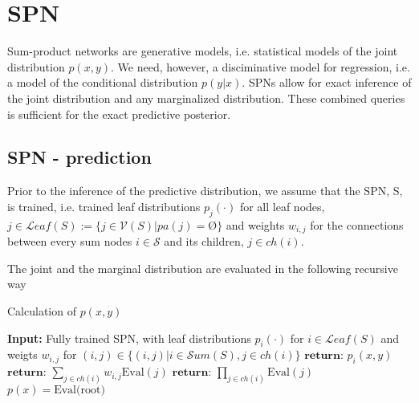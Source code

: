 \section{SPN}
Sum-product networks are generative models, i.e. statistical models of the joint distribution $p(x,y)$. 
We need, however, a disciminative model for regression, i.e. 
a model of the conditional distribution $p(y|x)$. 
SPNs allow for exact inference of the joint distribution 
and any marginalized distribution. These combined queries is sufficient for the
exact predictive posterior. 

\subsection{SPN - prediction}
Prior to the inference of the predictive distribution, we assume that the SPN, S, is trained, i.e.
trained leaf distributions $p_j(\cdot)$ for all leaf nodes, 
$j \in \mathcal{L}eaf(S):=\{j \in \mathcal{V}(S) |pa(j) = \text{Ø}\}$ and
weights $w_{i,j}$ for the connections between every sum nodes
$i \in \mathcal{S}$ and its children, $j \in ch(i)$.  

The joint and the marginal distribution are evaluated in the following recursive way
\begin{algorithm}
    \caption*{Calculation of $p(x,y)$}\label{SPN_1}
    \begin{algorithmic}
    \State \textbf{Input:} Fully trained SPN, with leaf distributions $p_i(\cdot)$ for $i\in \mathcal{L}eaf(S)$ and weigts 
    $w_{i,j}$ for $(i,j) \in \{(i,j)|i \in \mathcal{S}um(S), j \in ch(i)\}$ 
        \State  $\textbf{return: } p_i(x,y)$ 
    \EndIf
        \State $\textbf{return: } \sum_{j\in ch(i)} w_{i,j} \text{Eval}(j)$
    \EndIf
        \State $\textbf{return: } \prod_{j \in ch(i)} \text{Eval}(j)$
    \EndIf
    \EndFunction
    \State $p(x) =  \text{Eval(root)}$
    \end{algorithmic}
\end{algorithm}


